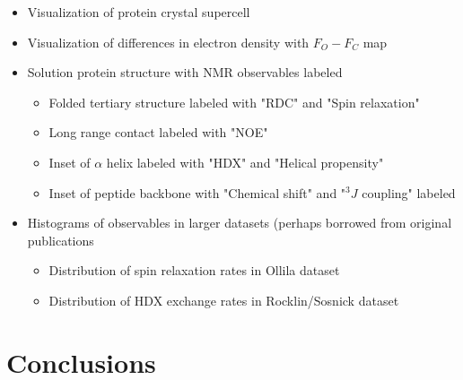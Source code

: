 \documentclass[9pt,review]{livecoms}
\begin{document}
\begin{itemize}

\item Visualization of protein crystal supercell

\item Visualization of differences in electron density with $F_O - F_C$ map

\item Solution protein structure with NMR observables labeled

	\begin{itemize}
	\item Folded tertiary structure labeled with "RDC" and "Spin relaxation"
	\item Long range contact labeled with "NOE"
	\item Inset of $\alpha$ helix labeled with "HDX" and "Helical propensity"
	\item Inset of peptide backbone with "Chemical shift" and "$^3J$ coupling" labeled
	\end{itemize}

\item Histograms of observables in larger datasets (perhaps borrowed from original publications

	\begin{itemize}
	\item Distribution of spin relaxation rates in Ollila dataset
	\item Distribution of HDX exchange rates in Rocklin/Sosnick dataset
	\end{itemize}

\end{itemize}

\section{Conclusions}
\end{document}
